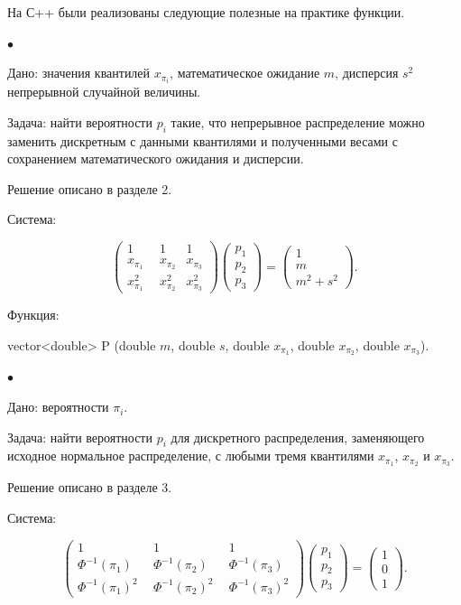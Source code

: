 \documentclass[12pt]{article}
\begin{document}
	На  С++ были реализованы следующие полезные на практике функции.
	
	$\bullet$ 
	
	Дано:
	значения квантилей $x_{\pi_{i}}$, математическое ожидание $m$, дисперсия $s^2$ непрерывной случайной величины.
	
	Задача:
	найти вероятности $p_{i}$ такие, что непрерывное распределение можно заменить дискретным с данными квантилями и полученными весами с сохранением математического ожидания и дисперсии.
	
	Решение описано в разделе 2.
	
	Система:
	
	\begin{equation*}
		\begin{pmatrix} 
			1&1&1\\ 
			x_{\pi_{1}} &  x_{\pi_{2}}  & x_{\pi_{3}} \\ 
			x_{\pi_{1}}^2~~&x_{\pi_{2}}^2  &x_{\pi_{3}}^2
		\end{pmatrix}
		\begin{pmatrix}p_{1}\\p_{2}\\ p_{3}\end{pmatrix}= \begin{pmatrix}1\\m\\m^{2}+s^{2}\end{pmatrix}.
	\end{equation*}
	
	Функция:
	
	vector<double> P (double $m$, double $s$, double $x_{\pi_{1}}$, double $x_{\pi_{2}}$, double $x_{\pi_{3}}$).
	
	
	$\bullet$
	
	Дано:
	вероятности $\pi_{i}$.
	
	Задача:
	найти вероятности $p_{i}$ для дискретного распределения, заменяющего исходное нормальное распределение, с любыми тремя квантилями $x_{\pi_{1}}$, $x_{\pi_{2}}$ и $x_{\pi_{3}}$.
	
	Решение описано в разделе 3.
	
	Система:
	
	\begin{equation*}
		\begin{pmatrix} 1&1&1\\ 
			\Phi^{-1}(\pi_{1})~~ &  \Phi ^{-1}(\pi_{2})~~  & \Phi ^{-1}(\pi_{3}) \\ 
			\Phi ^{-1}(\pi_{1})^{2}~~&\Phi ^{-1}(\pi_{2})^{2}~~  &\Phi ^{-1}(\pi_{3})^{2}
		\end{pmatrix}
		\begin{pmatrix}p_{1}\\p_{2}\\ p_{3}\end{pmatrix}= \begin{pmatrix}1\\0\\1\end{pmatrix}.
	\end{equation*}
	
\end{document}
